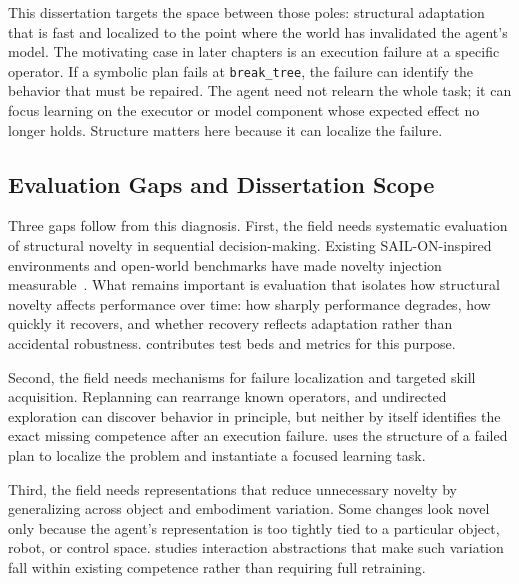 This dissertation targets the space between those poles: structural adaptation that is fast and localized to the point where the world has invalidated the agent's model.
The motivating case in later chapters is an execution failure at a specific operator.
If a symbolic plan fails at \texttt{break\_tree}, the failure can identify the behavior that must be repaired.
The agent need not relearn the whole task; it can focus learning on the executor or model component whose expected effect no longer holds.
Structure matters here because it can localize the failure.

\subsection{Evaluation Gaps and Dissertation Scope}
\label{sec:ow_gaps}

Three gaps follow from this diagnosis.
First, the field needs systematic evaluation of structural novelty in sequential decision-making.
Existing SAIL-ON-inspired environments and open-world benchmarks have made novelty injection measurable~\citep{senator2019science,holder2025introduction,balloch2022novgrid,goss2023polycraft,feeney2022novelcraft}.
What remains important is evaluation that isolates how structural novelty affects performance over time: how sharply performance degrades, how quickly it recovers, and whether recovery reflects adaptation rather than accidental robustness.
 contributes test beds and metrics for this purpose.

Second, the field needs mechanisms for failure localization and targeted skill acquisition.
Replanning can rearrange known operators, and undirected exploration can discover behavior in principle, but neither by itself identifies the exact missing competence after an execution failure.
 uses the structure of a failed plan to localize the problem and instantiate a focused learning task.

Third, the field needs representations that reduce unnecessary novelty by generalizing across object and embodiment variation.
Some changes look novel only because the agent's representation is too tightly tied to a particular object, robot, or control space.
 studies interaction abstractions that make such variation fall within existing competence rather than requiring full retraining.


